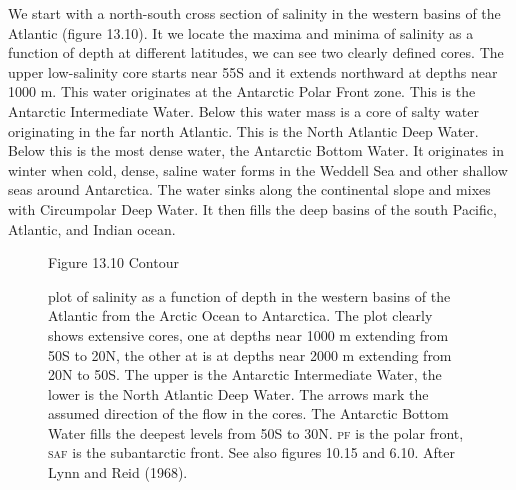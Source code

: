 We start with a north-south cross section of salinity in the western
basins of the Atlantic (figure 13.10). It we locate the maxima and
minima of salinity as a function of depth at different latitudes, we
can see two clearly defined cores. The upper low-salinity core starts
near 55\degrees S and it extends northward at depths near 1000 m. This
water originates at the Antarctic Polar Front zone. This is the
Antarctic Intermediate Water. Below this water mass is
a core of salty water originating in the far north Atlantic. This is
the North Atlantic Deep Water. Below this is the most
dense water, the Antarctic Bottom Water. It originates in winter when cold, dense, saline
water forms in the Weddell Sea and other shallow seas around
Antarctica. The water sinks along the continental slope and mixes with
Circumpolar Deep Water. It then fills the deep basins of the south
Pacific, Atlantic, and Indian ocean.

\begin{figure}[t!]
\footnotesize
Figure 13.10 Contour \rule{0pt}{3ex}plot of salinity as a function of
depth in the western basins of the Atlantic from the Arctic Ocean to
Antarctica. The plot clearly shows extensive cores, one at depths near
1000 m extending from 50\degrees S to 20\degrees N, the other at is at
depths near 2000 m extending from 20\degrees N to 50\degrees S. The
upper is the Antarctic Intermediate Water, the lower is the North
Atlantic Deep Water. The arrows mark
the assumed direction of the flow in the cores. The Antarctic Bottom
Water fills the deepest levels from
50\degrees S to 30\degrees N. \textsc{pf} is the polar front,
\textsc{saf} is the subantarctic front. See also figures 10.15 and
6.10. After Lynn and Reid (1968).
\label{fig:Cores}
\vspace{-3ex}
\end{figure}

